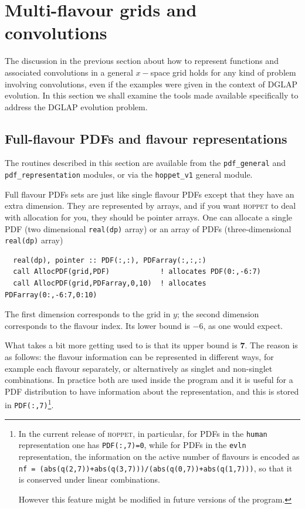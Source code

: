 \documentclass[12pt]{article}
\newcommand{\hoppet}{\textsc{hoppet}\xspace}
\newcommand{\ttt}[1]{\texttt{#1}}
\begin{document}
\section{Multi-flavour grids and convolutions}
\label{sec:dglapstructs}

The discussion in the previous section 
about how to represent functions and associated convolutions
in a general $x-$space grid holds for any kind of problem involving
convolutions, even if the examples were given in the context of DGLAP
evolution. In this section we shall examine the tools made available
specifically to address the DGLAP evolution problem.


\subsection{Full-flavour PDFs and flavour representations}
\label{sec:pdf-objects}

The routines described in this section
 are available from the \ttt{pdf\_general}
and \ttt{pdf\_representation} modules, or via the \ttt{hoppet\_v1}
general module.

Full flavour PDFs sets are just like single flavour PDFs except that they
have an extra dimension. They are represented by arrays, and if you
want \hoppet to deal with allocation for you, they should be pointer
arrays. One can allocate a single PDF (two dimensional
\texttt{real(dp)} array) or an array of PDFs (three-dimensional
\texttt{real(dp)} array)
\begin{lstlisting}
  real(dp), pointer :: PDF(:,:), PDFarray(:,:,:)
  call AllocPDF(grid,PDF)            ! allocates PDF(0:,-6:7)
  call AllocPDF(grid,PDFarray,0,10)  ! allocates PDFarray(0:,-6:7,0:10)
\end{lstlisting}
The first dimension corresponds to the grid in $y$; the second
dimension corresponds to the flavour index. Its lower bound is $-6$,
as one would expect. 

What takes a bit more getting used to is that its
upper bound is \textbf{7}. The reason is as follows: the flavour
information can be represented in different ways, for example each
flavour separately, or alternatively as singlet and non-singlet
combinations. In practice both are used inside the program and it is
useful for a PDF distribution to have information about the
representation, and this is stored in
\texttt{PDF(:,7)}\footnote{
In the current release of \hoppet, 
in particular, for PDFs in the \ttt{human} representation one
has \texttt{PDF(:,7)=0}, while for PDFs in the \ttt{evln}
representation, the information on the active number of flavours
is encoded as
\ttt{nf = (abs(q(2,7))+abs(q(3,7)))/(abs(q(0,7))+abs(q(1,7)))},
so that it is conserved under linear combinations.

However this feature might be modified in future
versions of the program.
}.
\end{document}
